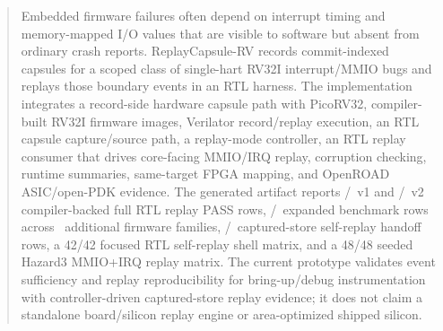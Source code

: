 \begin{abstract}
Embedded firmware failures often depend on interrupt timing and memory-mapped I/O values that are visible to software but absent from ordinary crash reports. ReplayCapsule-RV records commit-indexed capsules for a scoped class of single-hart RV32I interrupt/MMIO bugs and replays those boundary events in an RTL harness. The implementation integrates a record-side hardware capsule path with PicoRV32, compiler-built RV32I firmware images, Verilator record/replay execution, an RTL capsule capture/source path, a replay-mode controller, an RTL replay consumer that drives core-facing MMIO/IRQ replay, corruption checking, runtime summaries, same-target FPGA mapping, and OpenROAD ASIC/open-PDK evidence. The generated artifact reports \rcFullReplayPass/\rcFullReplayTotal\ v1 and \rcVTwoReplayPass/\rcVTwoReplayTotal\ v2 compiler-backed full RTL replay PASS rows, \rcExpandedReplayPass/\rcExpandedReplayTotal\ expanded benchmark rows across \rcExpandedBenchmarks\ additional firmware families, \rcSelfReplayPass/\rcSelfReplayTotal\ captured-store self-replay handoff rows, a 42/42 focused RTL self-replay shell matrix, and a 48/48 seeded Hazard3 MMIO+IRQ replay matrix. The current prototype validates event sufficiency and replay reproducibility for bring-up/debug instrumentation with controller-driven captured-store replay evidence; it does not claim a standalone board/silicon replay engine or area-optimized shipped silicon.
\end{abstract}
